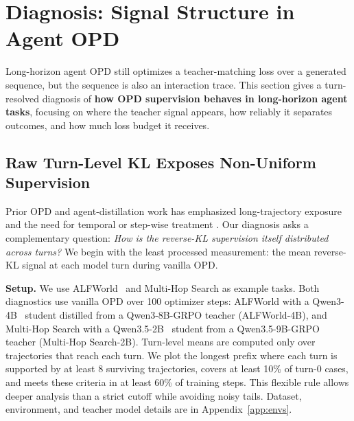 \section{Diagnosis: Signal Structure in Agent OPD}
\label{sec:diag}

Long-horizon agent OPD still optimizes a teacher-matching loss over a generated
sequence, but the sequence is also an interaction trace.
This section gives a turn-resolved diagnosis of \textbf{how OPD supervision behaves in
long-horizon agent tasks}, focusing on where the teacher signal appears, how
reliably it separates outcomes, and how much loss budget it receives.


\subsection{Raw Turn-Level KL Exposes Non-Uniform Supervision}
\label{sec:diag:surv}

Prior OPD and agent-distillation work has emphasized
long-trajectory exposure and the need for temporal or step-wise treatment
\citep{wang2026tcod,zhong2026sod}. Our diagnosis asks a
complementary question: \textit{How is the reverse-KL supervision itself distributed across turns?}
We begin with the least processed measurement: the mean reverse-KL signal at each model turn during vanilla OPD.

\textbf{Setup.}
We use ALFWorld~\citep{shridhar2021alfworld} and Multi-Hop Search as example tasks.
Both diagnostics use vanilla OPD over 100 optimizer steps: ALFWorld with a Qwen3-4B~\citep{yang2025qwen3} student distilled from a Qwen3-8B-GRPO teacher (ALFWorld-4B), and Multi-Hop Search with a Qwen3.5-2B~\citep{yang2025qwen3} student from a Qwen3.5-9B-GRPO teacher (Multi-Hop Search-2B).
Turn-level means are computed only over trajectories that reach each turn. We plot the longest prefix where each turn is supported by at least 8 surviving trajectories, covers at least 10\% of turn-0 cases, and meets these criteria in at least 60\% of training steps. This flexible rule allows deeper analysis than a strict cutoff while avoiding noisy tails.
Dataset, environment, and teacher model details are in Appendix~\ref{app:envs}.

